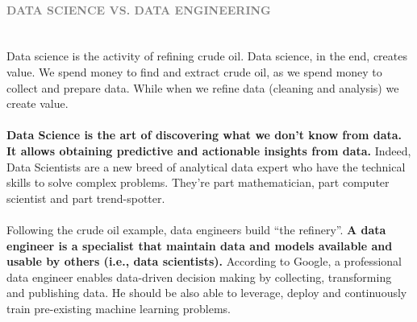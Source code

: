 \documentclass[10pt,a4paper]{article}
\newcommand{\nline}{\\~\\}
\newcommand{\myparagraph}[1]{\paragraph{\normalsize{\textcolor{gray}{\uppercase{\textbf{#1}}}} }\mbox{} \vspace{0.5em}\\}
\begin{document}
\myparagraph{Data Science vs. Data Engineering}
Data science is the activity of refining crude oil. Data science, in the end, creates value. We spend money to find and extract crude oil, as we spend money to collect and prepare data. While when we refine data (cleaning and analysis) we create value.
\nline
\textbf{Data Science is the art of discovering what we don’t know from data. It allows obtaining predictive and actionable insights from data.} Indeed, Data Scientists are a new breed of analytical data expert who have the technical skills to solve complex problems. They’re part mathematician, part computer scientist and part trend-spotter. 
\nline
Following the crude oil example, data engineers build “the refinery”. \textbf{A data engineer is a specialist that maintain data and models available and usable by others (i.e., data scientists).} According to Google, a professional data engineer enables data-driven decision making by collecting, transforming and publishing data. He should be also able to leverage, deploy and continuously train pre-existing machine learning problems.
\end{document}

